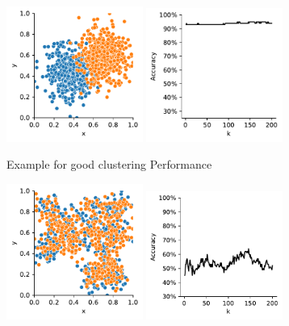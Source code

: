 \begin{figure}[htb]
	\centering
	\begin{subfigure}[b]{.475\textwidth}
		\centering
		\includegraphics[width=0.49\textwidth]{Figures/knn_sketch_scatter_good.pdf}
		\hfill
		\includegraphics[width=0.49\textwidth]{Figures/knn_sketch_line_good.pdf}
		\caption{Example for good clustering Performance}
		\label{fig:knn_sketch_good}
	\end{subfigure}
	\hfill
	\begin{subfigure}[b]{.475\textwidth}
		\centering
		\includegraphics[width=0.49\textwidth]{Figures/knn_sketch_scatter_bad.pdf}
		\hfill
		\includegraphics[width=0.49\textwidth]{Figures/knn_sketch_line_bad.pdf}

\end{subfigure}
\end{figure}
